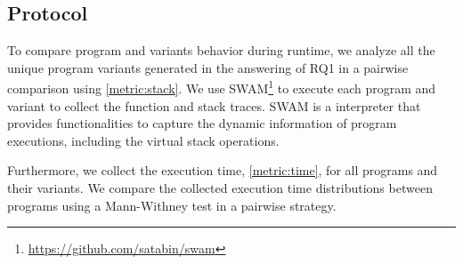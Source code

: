 \subsection*{Protocol}

To compare program and variants behavior during runtime, we analyze all the unique program variants generated in the answering of RQ1 in a pairwise comparison using \autoref{metric:stack}. We use SWAM\footnote{\url{https://github.com/satabin/swam}} to execute each program and variant to collect the function and stack traces. SWAM is a \wasm interpreter that provides functionalities to capture the dynamic information of \wasm program executions, including the virtual stack operations.

Furthermore, we collect the execution time, \autoref{metric:time}, for all programs and their variants. We compare the collected execution time distributions between programs using a Mann-Withney test \cite{mann1947} in a pairwise strategy.


 